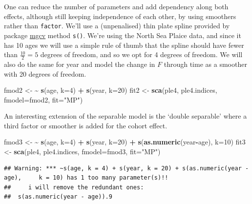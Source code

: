 \documentclass[
]{book}
\newenvironment{Shaded}{\begin{snugshade}}{\end{snugshade}}
\newcommand{\AttributeTok}[1]{\textcolor[rgb]{0.13,0.29,0.53}{#1}}
\newcommand{\DecValTok}[1]{\textcolor[rgb]{0.00,0.00,0.81}{#1}}
\newcommand{\ErrorTok}[1]{\textcolor[rgb]{0.64,0.00,0.00}{\textbf{#1}}}
\newcommand{\FunctionTok}[1]{\textcolor[rgb]{0.13,0.29,0.53}{\textbf{#1}}}
\newcommand{\NormalTok}[1]{#1}
\newcommand{\OtherTok}[1]{\textcolor[rgb]{0.56,0.35,0.01}{#1}}
\newcommand{\SpecialCharTok}[1]{\textcolor[rgb]{0.81,0.36,0.00}{\textbf{#1}}}
\newcommand{\StringTok}[1]{\textcolor[rgb]{0.31,0.60,0.02}{#1}}
\begin{document}
One can reduce the number of parameters and add dependency along both effects, although still keeping independence of each other, by using smoothers rather than \texttt{factor}. We'll use a (unpenalised) thin plate spline provided by package \href{http://cran.r-project.org/web/packages/mgcv/}{mgcv} method \texttt{s()}. We're using the North Sea Plaice data, and since it has 10 ages we will use a simple rule of thumb that the spline should have fewer than \(\frac{10}{2} = 5\) degrees of freedom, and so we opt for 4 degrees of freedom. We will also do the same for year and model the change in \(F\) through time as a smoother with 20 degrees of freedom.

\begin{Shaded}
\begin{Highlighting}[]
\NormalTok{fmod2 }\OtherTok{\textless{}{-}} \ErrorTok{\textasciitilde{}} \FunctionTok{s}\NormalTok{(age, }\AttributeTok{k=}\DecValTok{4}\NormalTok{) }\SpecialCharTok{+} \FunctionTok{s}\NormalTok{(year, }\AttributeTok{k=}\DecValTok{20}\NormalTok{)}
\NormalTok{fit2 }\OtherTok{\textless{}{-}} \FunctionTok{sca}\NormalTok{(ple4, ple4.indices, }\AttributeTok{fmodel=}\NormalTok{fmod2, }\AttributeTok{fit=}\StringTok{"MP"}\NormalTok{)}
\end{Highlighting}
\end{Shaded}

An interesting extension of the separable model is the `double separable' where a third factor or smoother is added for the cohort effect.

\begin{Shaded}
\begin{Highlighting}[]
\NormalTok{fmod3 }\OtherTok{\textless{}{-}} \ErrorTok{\textasciitilde{}} \FunctionTok{s}\NormalTok{(age, }\AttributeTok{k=}\DecValTok{4}\NormalTok{) }\SpecialCharTok{+} \FunctionTok{s}\NormalTok{(year, }\AttributeTok{k=}\DecValTok{20}\NormalTok{) }\SpecialCharTok{+} \FunctionTok{s}\NormalTok{(}\FunctionTok{as.numeric}\NormalTok{(year}\SpecialCharTok{{-}}\NormalTok{age), }\AttributeTok{k=}\DecValTok{10}\NormalTok{)}
\NormalTok{fit3 }\OtherTok{\textless{}{-}} \FunctionTok{sca}\NormalTok{(ple4, ple4.indices, }\AttributeTok{fmodel=}\NormalTok{fmod3, }\AttributeTok{fit=}\StringTok{"MP"}\NormalTok{)}
\end{Highlighting}
\end{Shaded}

\begin{verbatim}
## Warning: *** ~s(age, k = 4) + s(year, k = 20) + s(as.numeric(year - age),     k = 10) has 1 too many parameter(s)!!
##     i will remove the redundant ones:
##  s(as.numeric(year - age)).9
\end{verbatim}
\end{document}
